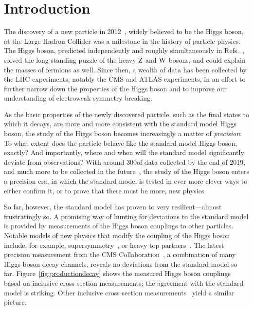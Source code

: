 \section{Introduction}
\label{sec:introduction}


The discovery of a new particle in 2012~\cite{Aad:2012tfa,Chatrchyan:2012xdj,Chatrchyan:2013lba}, widely believed to be the Higgs boson, at the Large Hadron Collider was a milestone in the history of particle physics.
% 
The Higgs boson, predicted independently and roughly simultaneously in Refs.~\cite{Higgs:1964pj,Englert:1964et,Guralnik:1964eu}, solved the long-standing puzzle of the heavy $\mathrm{Z}$ and $\mathrm{W}$ bosons, and could explain the masses of fermions as well.
% 
Since then, a wealth of data has been collected by the LHC experiments, notably the CMS and ATLAS experiments, in an effort to further narrow down the properties of the Higgs boson and to improve our understanding of electroweak symmetry breaking.


As the basic properties of the newly discovered particle, such as the final states to which it decays, are more and more consistent with the standard model Higgs boson, the study of the Higgs boson becomes increasingly a matter of \textit{precision}: To what extent does the particle behave like the standard model Higgs boson, exactly?
% 
And importantly, where and when will the standard model significantly deviate from observations?
% 
With around 300\fbinv of data collected by the end of 2019, and much more to be collected in the future~\cite{hllhc}, the study of the Higgs boson enters a precision era, in which the standard model is tested in ever more clever ways to either confirm it, or to prove that there must be more, new physics.


So far, however, the standard model has proven to very resilient---almost frustratingly so.
% 
A promising way of hunting for deviations to the standard model is provided by measurements of the Higgs boson couplings to other particles.
% 
Notable models of new physics that modify the coupling of the Higgs boson include, for example, supersymmetry~\cite{Dimopoulos:1981zb,Witten:1981nf}, or heavy top partners~\cite{ArkaniHamed:2002qy,Banfi:2013yoa}.
% 
The latest precision measurement from the CMS Collaboration~\cite{Sirunyan:2018koj}, a combination of many Higgs boson decay channels, reveals no deviations from the standard model so far.
% 
Figure~\ref{fig:productiondecay} shows the measured Higgs boson couplings based on inclusive cross section measurements; the agreement with the standard model is striking.
% 
Other inclusive cross section measurements~\cite{Khachatryan:2016vau,Aad:2015zhl} yield a similar picture.


